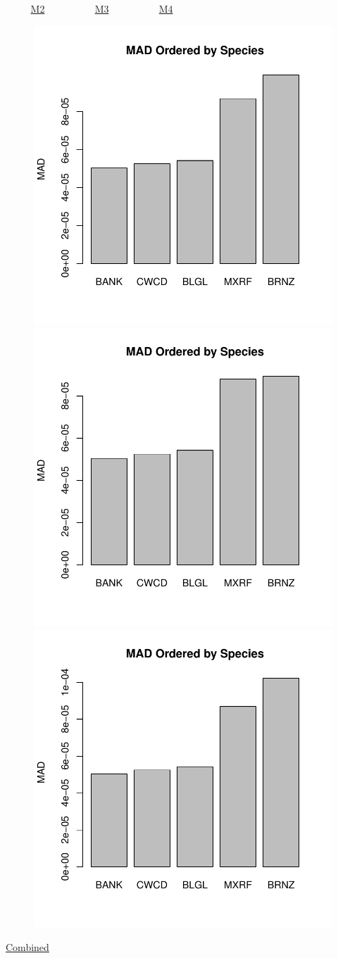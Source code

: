\documentclass[ xcolor = pdftex, dvipsnames, table ]{beamer}
\begin{document}
\begin{frame}{$~~~~~~~~~~$ \href{https://github.com/gasduster99/sppComp/tree/master/sscRuns/25019781982M2}{M2} $~~~~~~~~~~~~~~~~~~~~$ \href{https://github.com/gasduster99/sppComp/tree/master/sscRuns/25019781982M3}{M3} $~~~~~~~~~~~~~~~~~~~~$ \href{https://github.com/gasduster99/sppComp/tree/master/sscRuns/25019781982M4}{M4} }	
	\begin{figure}[ht!]
        \centering
	\hspace*{-1cm}
        \includegraphics[width=.4\textwidth]{../sscRuns/25019781982M2/sppTailMad68.pdf}
        \includegraphics[width=.4\textwidth]{../sscRuns/25019781982M3/sppTailMad68.pdf}
	\includegraphics[width=.4\textwidth]{../sscRuns/25019781982M4/sppTailMad68.pdf}
	\end{figure}
	\vspace{-1cm}
	\begin{center}
	\Large
	\href{https://github.com/gasduster99/sppComp/tree/master/try1/postSSC/25019781982M2M3M4}{Combined}
	\end{center}
\end{frame}
\end{document}
